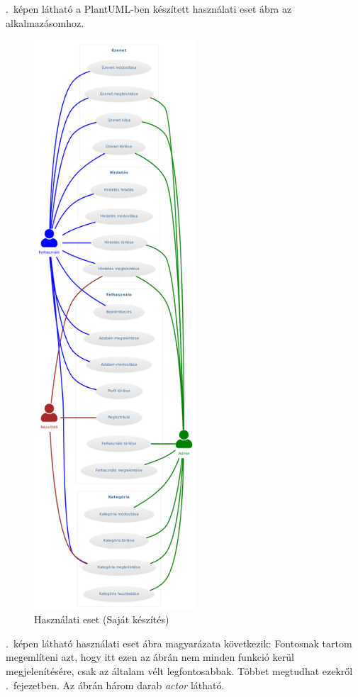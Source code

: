 \documentclass[]{thesis-ekf}
\theoremstyle{definition}
\theoremstyle{remark}
\begin{document}
	.~képen látható a PlantUML-ben készített használati eset ábra az alkalmazásomhoz.
	\begin{figure}[ht!]
		\centering
		\includegraphics[width=6cm]{./tervezes/useCase}
		\caption{Használati eset (Saját készítés)} 
		\label{useCase}
	\end{figure}
	.~képen látható használati eset ábra magyarázata következik:
	Fontosnak tartom megemlíteni azt, hogy itt ezen az ábrán nem minden funkció kerül megjelenítésére, csak az általam vélt  legfontosabbak. Többet megtudhat ezekről .~fejezetben. Az ábrán három darab \emph{actor} látható.
\end{document}
